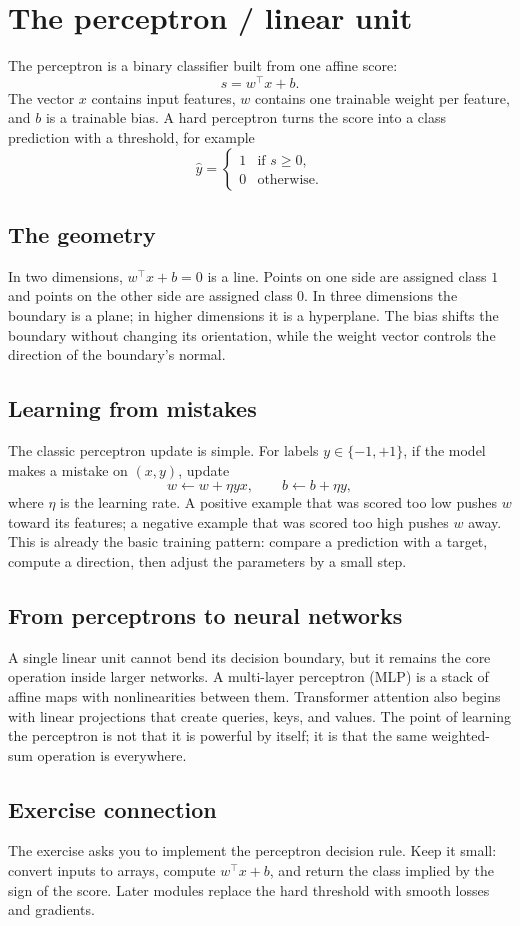 \section{The perceptron / linear unit}\label{sec:01}

The perceptron is a binary classifier built from one affine score:
\[
  s = w^\top x + b.
\]
The vector $x$ contains input features, $w$ contains one trainable weight per
feature, and $b$ is a trainable bias. A hard perceptron turns the score into a
class prediction with a threshold, for example
\[
  \hat{y} =
  \begin{cases}
    1 & \text{if } s \ge 0,\\
    0 & \text{otherwise.}
  \end{cases}
\]

\subsection*{The geometry}
In two dimensions, $w^\top x + b = 0$ is a line. Points on one side are assigned
class $1$ and points on the other side are assigned class $0$. In three
dimensions the boundary is a plane; in higher dimensions it is a hyperplane.
The bias shifts the boundary without changing its orientation, while the weight
vector controls the direction of the boundary's normal.

\subsection*{Learning from mistakes}
The classic perceptron update is simple. For labels $y \in \{-1, +1\}$, if the
model makes a mistake on $(x,y)$, update
\[
  w \leftarrow w + \eta yx,
  \qquad
  b \leftarrow b + \eta y,
\]
where $\eta$ is the learning rate. A positive example that was scored too low
pushes $w$ toward its features; a negative example that was scored too high
pushes $w$ away. This is already the basic training pattern: compare a
prediction with a target, compute a direction, then adjust the parameters by a
small step.

\subsection*{From perceptrons to neural networks}
A single linear unit cannot bend its decision boundary, but it remains the core
operation inside larger networks. A multi-layer perceptron (MLP) is a stack of affine
maps with nonlinearities between them. Transformer attention also begins with
linear projections that create queries, keys, and values. The point of learning
the perceptron is not that it is powerful by itself; it is that the same
weighted-sum operation is everywhere.

\subsection*{Exercise connection}
The exercise asks you to implement the perceptron decision rule. Keep it small:
convert inputs to arrays, compute $w^\top x + b$, and return the class implied
by the sign of the score. Later modules replace the hard threshold with smooth
losses and gradients.
